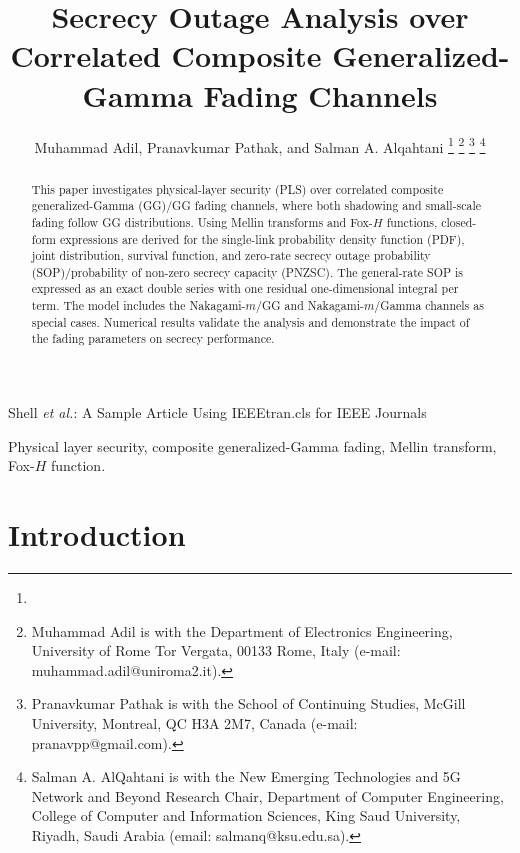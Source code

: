 \documentclass[lettersize,journal]{IEEEtran}
\begin{document}
\title{Secrecy Outage Analysis over Correlated Composite Generalized-Gamma Fading Channels}
 

\author{Muhammad Adil, Pranavkumar Pathak, and Salman A. Alqahtani
\thanks{}
\thanks{Muhammad Adil is with the Department of Electronics Engineering,
University of Rome Tor Vergata, 00133 Rome, Italy
(e-mail: muhammad.adil@uniroma2.it).}
\thanks{Pranavkumar Pathak is with the School of Continuing Studies, McGill University, Montreal, QC H3A 2M7, Canada (e-mail: pranavpp@gmail.com).}
\thanks{Salman A. AlQahtani is with the New Emerging Technologies and 5G Network and Beyond Research Chair, Department of Computer Engineering, College of Computer and Information Sciences, King Saud University, Riyadh, Saudi Arabia (email: salmanq@ksu.edu.sa).}
}

\markboth{}%
{Shell \MakeLowercase{\textit{et al.}}: A Sample Article Using IEEEtran.cls for IEEE Journals}

\maketitle


\begin{abstract}
This paper investigates physical-layer security (PLS) over correlated composite generalized-Gamma (GG)/GG fading channels, where both shadowing and small-scale fading follow GG distributions. Using Mellin transforms and Fox-$H$ functions, closed-form expressions are derived for the single-link probability density function (PDF), joint distribution, survival function, and zero-rate secrecy outage probability (SOP)/probability of non-zero secrecy capacity (PNZSC). The general-rate SOP is expressed as an exact double series with one residual one-dimensional integral per term. The model includes the Nakagami-$m$/GG and Nakagami-$m$/Gamma channels as special cases. Numerical results validate the analysis and demonstrate the impact of the fading parameters on secrecy performance.
\end{abstract}


\begin{IEEEkeywords}
Physical layer security, composite generalized-Gamma fading, Mellin transform, Fox-\(H\) function.
\end{IEEEkeywords}


\section{Introduction}
\end{document}
